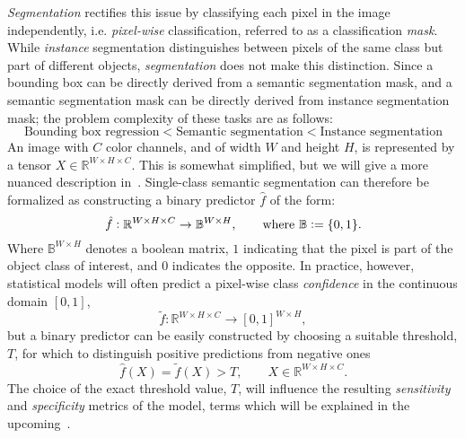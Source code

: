 \textit{Segmentation} rectifies this issue by classifying each pixel in the image independently, i.e. \textit{pixel-wise} classification, referred to as a classification \textit{mask}.
While \textit{instance} segmentation distinguishes between pixels of the same class but part of different objects, \textit{segmentation} does not make this distinction.
Since a bounding box can be directly derived from a semantic segmentation mask, and a semantic segmentation mask can be directly derived from instance segmentation mask; the problem complexity of these tasks are as follows:
%
\begin{equation*}
  \text{Bounding box regression}
  <
  \text{Semantic segmentation}
  <
  \text{Instance segmentation}
\end{equation*}
%
An image with $C$ color channels, and of width $W$ and height $H$, is represented by a tensor $X \in \mathbb{R}^{W \times H \times C}$.
This is somewhat simplified, but we will give a more nuanced description in~.
Single-class semantic segmentation can therefore be formalized as constructing a binary predictor $\hat{f}$ of the form:
%
\begin{equation*}
  \hat{f}: \mathbb{R}^{W \times H \times C} \rightarrow \mathbb{B}^{W \times H}, \hspace{2em} \text{where } \mathbb{B} \vcentcolon= \{0, 1\}.
\end{equation*}
%
Where $\mathbb{B}^{W \times H}$ denotes a boolean matrix, $1$ indicating that the pixel is part of the object class of interest, and $0$ indicates the opposite.
In practice, however, statistical models will often predict a pixel-wise class \textit{confidence} in the continuous domain $[0, 1]$,
%
\begin{equation*}
  \tilde{f}: \mathbb{R}^{W \times H \times C} \rightarrow {[0, 1]}^{W \times H},
\end{equation*}
%
but a binary predictor can be easily constructed by choosing a suitable threshold, $T$, for which to distinguish positive predictions from negative ones
%
\begin{equation*}
  \hat{f}(X) = \tilde{f}(X) > T, \hspace{2em} X \in \mathbb{R}^{W \times H \times C}.
\end{equation*}
%
The choice of the exact threshold value, $T$, will influence the resulting \textit{sensitivity} and \textit{specificity} metrics of the model, terms which will be explained in the upcoming~.
